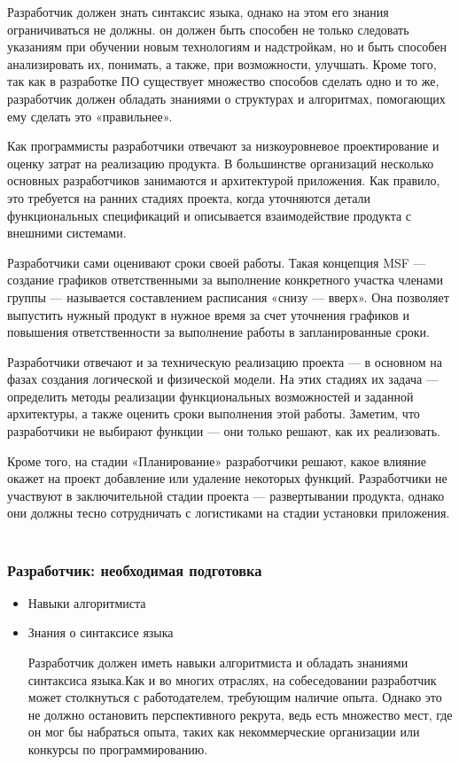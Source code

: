 \documentclass{../industrial-development}
\begin{document}
\lecturenotes

Разработчик должен знать синтаксис языка, однако на этом его знания ограничиваться не должны. он должен быть способен не только следовать указаниям при обучении новым технологиям и надстройкам, но и быть способен анализировать их, понимать, а также, при возможности, улучшать. Кроме того, так как в разработке ПО существует множество способов сделать одно и то же, разработчик должен обладать знаниями о структурах и алгоритмах, помогающих ему сделать это «правильнее».   ~\cite{Anatomy}

Как программисты разработчики отвечают за низкоуровневое проектирование и оценку затрат на реализацию продукта. В большинстве организаций несколько основных разработчиков занимаются и архитектурой приложения. Как правило, это требуется на ранних ста­диях проекта, когда уточняются детали функциональных спецификаций и описывается взаимодействие продукта с внешними системами.

Разработчики сами оценивают сроки своей работы. Такая концепция MSF — создание графиков ответственными за выполнение конкретного участка членами группы — называется составлением расписания «снизу — вверх». Она позволяет выпустить нужный продукт в нужное время за счет уточнения графиков и повышения ответственности за выполнение работы в запланированные сроки.

Разработчики отвечают и за техническую реализацию проекта — в основном на фазах создания логической и физической модели. На этих стадиях их задача — определить методы реализации функциональных возможностей и заданной архитектуры, а также оценить сроки выполнения этой работы. Заметим, что разработчики не выбирают функции — они только решают, как их реализовать.

Кроме того, на стадии «Планирование» разработчики решают, какое влияние окажет на проект добавление или удаление некоторых функций. Разработчики не участвуют в заключительной стадии проекта — развертывании продукта, однако они должны тесно сотрудничать с логистиками на стадии установки приложения. ~\cite{Collective}
\begin{frame} \frametitle{Разработчик: необходимая подготовка}
  \begin{itemize}
  \item Навыки алгоритмиста 
  \item Знания о синтаксисе языка
  \begin{block}{}
  	\alert {Разработчик} должен иметь навыки алгоритмиста и обладать знаниями синтаксиса языка.Как и во многих отраслях, на собеседовании разработчик может столкнуться с работодателем, требующим наличие опыта. Однако это не должно остановить перспективного рекрута, ведь есть множество мест, где он мог бы набраться опыта, таких как некоммерческие организации или конкурсы по программированию. 
  \end{block}
  \end{itemize}

\end{frame}
\end{document}
